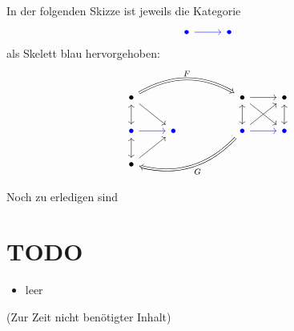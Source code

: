 \documentclass[a4paper]{amsart}
\theoremstyle{definition}
\begin{document}
In der folgenden Skizze ist jeweils die Kategorie
\begin{equation}
   \begin{tikzcd}
      \color{blue}\bullet \arrow[blue,r] & \color{blue}\bullet
   \end{tikzcd}
\end{equation}
als Skelett blau hervorgehoben:
\begin{equation}
   \begin{tikzcd}
      \bullet \arrow[leftrightarrow,d] \arrow[dr] \arrow[Rightarrow,rrr, bend left, "F"]&&& 
      \bullet \arrow[leftrightarrow,d] \arrow[r] \arrow[dr] & \bullet \arrow[leftrightarrow,d]\\
      \color{blue}\bullet \arrow[leftrightarrow,d] \arrow[blue,r] & \color{blue}\bullet && 
      \color{blue}\bullet                          \arrow[r,blue] \arrow[ur] \arrow[Rightarrow,llld, bend left, "G"] & \color{blue}\bullet \\
      \bullet           \arrow[ur]
   \end{tikzcd}
\end{equation}

\begin{backup}
Noch zu erledigen sind
\section{TODO}
\begin{itemize}
   \item leer
\end{itemize}
\end{backup}

\begin{backup}
    (Zur Zeit nicht benötigter Inhalt)
\end{backup}
\end{document}
